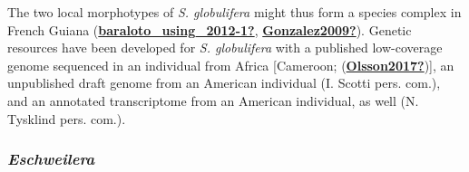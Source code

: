 \documentclass[12pt,twoside,a4paper, a]{article}
\begin{document}
The two local morphotypes of \emph{S. globulifera} might thus form a species complex in French Guiana (\protect\hyperlink{ref-baraloto_using_2012-1}{\textbf{baraloto\_using\_2012-1?}}, \protect\hyperlink{ref-Gonzalez2009}{\textbf{Gonzalez2009?}}).
Genetic resources have been developed for \emph{S. globulifera} with a published low-coverage genome sequenced in an individual from Africa {[}Cameroon; (\protect\hyperlink{ref-Olsson2017}{\textbf{Olsson2017?}}){]},
an unpublished draft genome from an American individual (I. Scotti pers. com.),
and an annotated transcriptome from an American individual, as well (N. Tysklind pers. com.).

\hypertarget{eschweilera}{%
\subsubsection{\texorpdfstring{\emph{Eschweilera}}{Eschweilera}}\label{eschweilera}}
\end{document}
